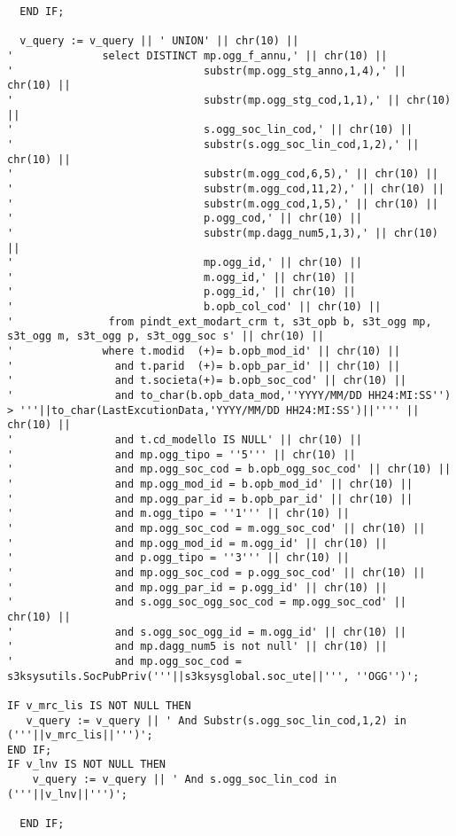 \begin{lstlisting}
  END IF;
  
  v_query := v_query || ' UNION' || chr(10) ||
'              select DISTINCT mp.ogg_f_annu,' || chr(10) ||
'                              substr(mp.ogg_stg_anno,1,4),' || chr(10) ||
'                              substr(mp.ogg_stg_cod,1,1),' || chr(10) ||
'                              s.ogg_soc_lin_cod,' || chr(10) ||
'                              substr(s.ogg_soc_lin_cod,1,2),' || chr(10) ||
'                              substr(m.ogg_cod,6,5),' || chr(10) ||
'                              substr(m.ogg_cod,11,2),' || chr(10) ||
'                              substr(m.ogg_cod,1,5),' || chr(10) ||
'                              p.ogg_cod,' || chr(10) ||
'                              substr(mp.dagg_num5,1,3),' || chr(10) ||
'                              mp.ogg_id,' || chr(10) ||
'                              m.ogg_id,' || chr(10) ||
'                              p.ogg_id,' || chr(10) ||
'                              b.opb_col_cod' || chr(10) ||
'               from pindt_ext_modart_crm t, s3t_opb b, s3t_ogg mp, s3t_ogg m, s3t_ogg p, s3t_ogg_soc s' || chr(10) ||
'              where t.modid  (+)= b.opb_mod_id' || chr(10) ||
'                and t.parid  (+)= b.opb_par_id' || chr(10) ||
'                and t.societa(+)= b.opb_soc_cod' || chr(10) ||
'                and to_char(b.opb_data_mod,''YYYY/MM/DD HH24:MI:SS'') > '''||to_char(LastExcutionData,'YYYY/MM/DD HH24:MI:SS')||'''' || chr(10) ||
'                and t.cd_modello IS NULL' || chr(10) ||
'                and mp.ogg_tipo = ''5''' || chr(10) ||
'                and mp.ogg_soc_cod = b.opb_ogg_soc_cod' || chr(10) ||
'                and mp.ogg_mod_id = b.opb_mod_id' || chr(10) ||
'                and mp.ogg_par_id = b.opb_par_id' || chr(10) ||
'                and m.ogg_tipo = ''1''' || chr(10) ||
'                and mp.ogg_soc_cod = m.ogg_soc_cod' || chr(10) ||
'                and mp.ogg_mod_id = m.ogg_id' || chr(10) ||
'                and p.ogg_tipo = ''3''' || chr(10) ||
'                and mp.ogg_soc_cod = p.ogg_soc_cod' || chr(10) ||
'                and mp.ogg_par_id = p.ogg_id' || chr(10) ||
'                and s.ogg_soc_ogg_soc_cod = mp.ogg_soc_cod' || chr(10) ||
'                and s.ogg_soc_ogg_id = m.ogg_id' || chr(10) ||
'                and mp.dagg_num5 is not null' || chr(10) ||
'                and mp.ogg_soc_cod = s3ksysutils.SocPubPriv('''||s3ksysglobal.soc_ute||''', ''OGG'')';

IF v_mrc_lis IS NOT NULL THEN
   v_query := v_query || ' And Substr(s.ogg_soc_lin_cod,1,2) in ('''||v_mrc_lis||''')';
END IF;
IF v_lnv IS NOT NULL THEN
    v_query := v_query || ' And s.ogg_soc_lin_cod in ('''||v_lnv||''')';
    
  END IF;
\end{lstlisting}

